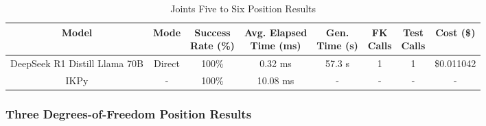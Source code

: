 \begin{landscape}
\begin{table}[H]
\tiny
\renewcommand{\arraystretch}{1.2}
\caption{Joints Five to Six Position Results}
\begin{center}
\begin{tabular}{|c|c|c|c|c|c|c|c|}
    \hline
    \textbf{Model} & 
    \textbf{Mode} & 
    \makecell{\textbf{Success}\\\textbf{Rate (\%)}} &
    \makecell{\textbf{Avg. Elapsed}\\\textbf{Time (ms)}} &
    \makecell{\textbf{Gen.}\\\textbf{Time (s)}} &
    \makecell{\textbf{FK}\\\textbf{Calls}} &
    \makecell{\textbf{Test}\\\textbf{Calls}} &
    \textbf{Cost (\$)} \\
    \hline
    DeepSeek R1 Distill Llama 70B & Direct & 100\% & 0.32 ms & 57.3 s & 1 & 1 & \$0.011042 \\
    \hline
    IKPy & - & 100\% & 10.08 ms & - & - & - & - \\
    \hline
\end{tabular}
\label{Results-Position-5-6}
\end{center}
\end{table}

\subsubsection{Three Degrees-of-Freedom Position Results}


\end{landscape}
